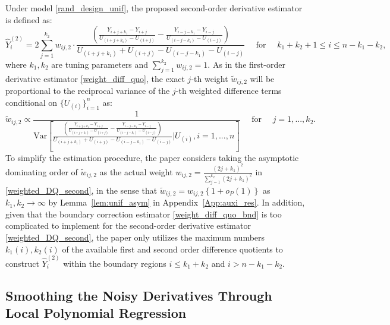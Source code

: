 \documentclass{uwstat572}
\theoremstyle{definition}
\renewcommand{\hat}{\widehat}
\renewcommand{\tilde}{\widetilde}
\theoremstyle{theorem}
\begin{document}
Under model \eqref{rand_design_unif}, the proposed second-order derivative estimator is defined as:
\begin{equation}
\label{weighted_DQ_second}
\hat{Y}_i^{(2)} = 2\sum_{j=1}^{k_2} w_{ij,2} \cdot \frac{\left(\frac{Y_{i+j+k_1} -Y_{i+j}}{U_{(i+j+k_1)} - U_{(i+j)}} - \frac{Y_{i-j-k_1} -Y_{i-j}}{U_{(i-j-k_1)} - U_{(i-j)}} \right)}{U_{(i+j+k_1)} + U_{(i+j)} - U_{(i-j-k_1)} -U_{(i-j)}} \quad \text{ for } \quad k_1+k_2 +1 \leq i\leq n-k_1-k_2,
\end{equation}
where $k_1,k_2$ are tuning parameters and $\sum_{j=1}^{k_2} w_{ij,2}=1$. As in the first-order derivative estimator \eqref{weight_diff_quo}, the exact $j$-th weight $\tilde{w}_{ij,2}$ will be proportional to the reciprocal variance of the $j$-th weighted difference terms conditional on $\{U_{(i)}\}_{i=1}^n$ as:
$$\tilde{w}_{ij,2} \propto \frac{1}{\mathrm{Var}\left[\frac{\left(\frac{Y_{i+j+k_1} -Y_{i+j}}{U_{(i+j+k_1)} - U_{(i+j)}} - \frac{Y_{i-j-k_1} -Y_{i-j}}{U_{(i-j-k_1)} - U_{(i-j)}} \right)}{U_{(i+j+k_1)} + U_{(i+j)} - U_{(i-j-k_1)} -U_{(i-j)}} \bigg| U_{(i)},i=1,...,n \right]} \quad \text{ for } \quad j=1,...,k_2.$$
To simplify the estimation procedure, the paper considers taking the asymptotic dominating order of $\tilde{w}_{ij,2}$ as the actual weight $w_{ij,2}=\frac{(2j+k_1)^2}{\sum_{j=1}^{k_2} (2j+k_1)^2}$ in \eqref{weighted_DQ_second}, in the sense that $\tilde{w}_{ij,2} = w_{ij,2}\left\{1+o_P(1)\right\}$ as $k_1,k_2 \to \infty$ by Lemma~\ref{lem:unif_asym} in Appendix~\ref{App:auxi_res}. In addition, given that the boundary correction estimator \eqref{weight_diff_quo_bnd} is too complicated to implement for the second-order derivative estimator \eqref{weighted_DQ_second}, the paper only utilizes the maximum numbers $k_1(i),k_2(i)$ of the available first and second order difference quotients to construct $\hat{Y}_i^{(2)}$ within the boundary regions $i\leq k_1+k_2$ and $i> n-k_1-k_2$. 

\subsection{Smoothing the Noisy Derivatives Through Local Polynomial Regression}
\label{Sec:loc_poly}
\end{document}
